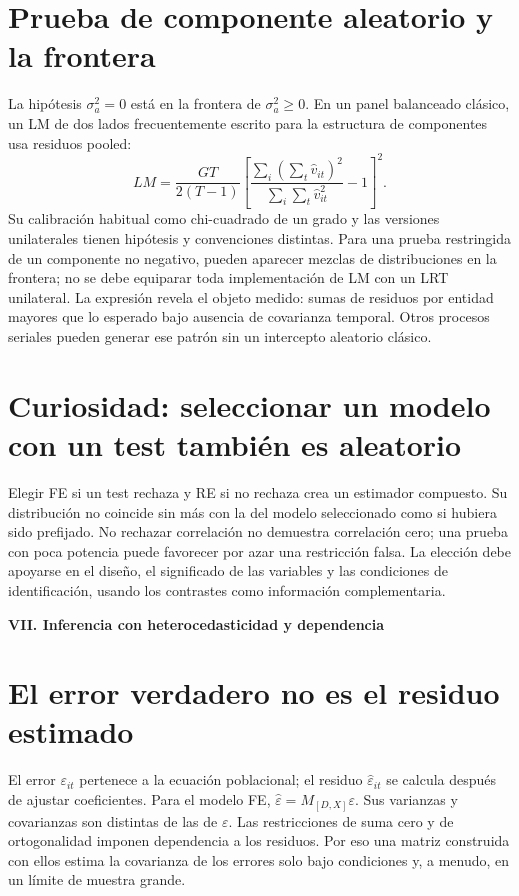 \documentclass[11pt,a4paper]{article}
\theoremstyle{definition}
\newcommand{\parte}[1]{\par\bigskip\Needspace{8\baselineskip}\begin{center}{\Large\bfseries\color{azul}#1}\end{center}}
\newcommand{\eps}{\varepsilon}
\begin{document}
\section{Prueba de componente aleatorio y la frontera}
La hipótesis $\sigma_a^2=0$ está en la frontera de $\sigma_a^2\ge0$.
En un panel balanceado clásico, un LM de dos lados frecuentemente escrito para la estructura de componentes usa residuos pooled:
\[
LM=\frac{GT}{2(T-1)}
\left[
\frac{\sum_i(\sum_t\widehat v_{it})^2}
{\sum_i\sum_t\widehat v_{it}^2}-1
\right]^2.
\]
Su calibración habitual como chi-cuadrado de un grado y las versiones unilaterales tienen hipótesis y convenciones distintas. Para una prueba restringida de un componente no negativo, pueden aparecer mezclas de distribuciones en la frontera; no se debe equiparar toda implementación de LM con un LRT unilateral.
La expresión revela el objeto medido: sumas de residuos por entidad mayores que lo esperado bajo ausencia de covarianza temporal. Otros procesos seriales pueden generar ese patrón sin un intercepto aleatorio clásico.

\section{Curiosidad: seleccionar un modelo con un test también es aleatorio}
Elegir FE si un test rechaza y RE si no rechaza crea un estimador compuesto.
Su distribución no coincide sin más con la del modelo seleccionado como si hubiera sido prefijado.
No rechazar correlación no demuestra correlación cero; una prueba con poca potencia puede favorecer por azar una restricción falsa.
La elección debe apoyarse en el diseño, el significado de las variables y las condiciones de identificación, usando los contrastes como información complementaria.



\parte{VII. Inferencia con heterocedasticidad y dependencia}
\section{El error verdadero no es el residuo estimado}
El error $\eps_{it}$ pertenece a la ecuación poblacional; el residuo $\widehat\eps_{it}$ se calcula después de ajustar coeficientes. Para el modelo FE,
$\widehat\eps=M_{[D,X]}\eps$.
Sus varianzas y covarianzas son distintas de las de $\eps$.
Las restricciones de suma cero y de ortogonalidad imponen dependencia a los residuos. Por eso una matriz construida con ellos estima la covarianza de los errores solo bajo condiciones y, a menudo, en un límite de muestra grande.
\end{document}
